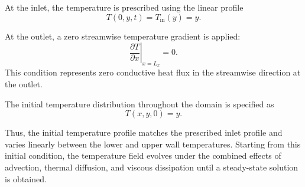 At the inlet, the temperature is prescribed using the
linear profile
\begin{equation}
T(0,y,t)=T_{\mathrm{in}}(y)=y.
\label{eq:inlet_temperature_condition}
\end{equation}

At the outlet, a zero streamwise temperature gradient is
applied:
\begin{equation}
\left.\frac{\partial T}{\partial x}\right|_{x=L_x}=0.
\label{eq:outlet_temperature_condition}
\end{equation}
This condition represents zero conductive heat flux in the
streamwise direction at the outlet.

The initial temperature distribution throughout the domain
is specified as
\begin{equation}
\boxed{
T(x,y,0)=y.
}
\label{eq:initial_temperature}
\end{equation}

Thus, the initial temperature profile matches the prescribed
inlet profile and varies linearly between the lower and upper
wall temperatures. Starting from this initial condition, the
temperature field evolves under the combined effects of
advection, thermal diffusion, and viscous dissipation until
a steady-state solution is obtained.